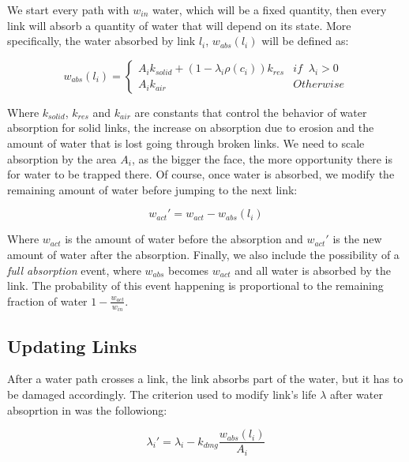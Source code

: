 \vspace{10pt}

We start every path with $w_{in}$ water, which will be a fixed quantity, then 
every link will absorb a quantity of water that will depend on its state. 
More specifically, the water absorbed by link $l_i$, $w_{abs}(l_i)$
will be defined as:

\begin{equation}\label{eq:w_abs}
    w_{abs}(l_i) = \begin{cases}
        A_ik_{solid} + (1 - \lambda_i \rho(c_i))k_{res} & if \; \; \lambda_i > 0\\
        A_ik_{air} & Otherwise
    \end{cases}
\end{equation}

Where $k_{solid}$, $k_{res}$ and $k_{air}$ are constants that control the 
behavior of water absorption for solid links, the increase on absorption 
due to erosion and the amount of water that is lost going through broken 
links. We need to scale absorption by the area $A_i$, as the bigger 
the face, the more opportunity there is for water to be trapped there. 
Of course, once water is absorbed, we modify the remaining amount of water 
before jumping to the next link:

\begin{equation}
    w_{act}' = w_{act} - w_{abs}(l_i)
\end{equation}

Where $w_{act}$ is the amount of water before the absorption and 
$w_{act}'$ is the new amount of water after the absorption. Finally,
we also include the possibility of a \textit{full absorption} event, 
where $w_{abs}$ becomes $w_{act}$ and all water is absorbed by the link. 
The probability of this event happening is proportional to the remaining 
fraction of water $1 - \frac{w_{act}}{w_{in}}$.
\subsection{Updating Links} \label{sec:linkUpdate}
After a water path crosses a link, the link absorbs part of the water,
but it has to be damaged accordingly. The criterion used to modify link's
life $\lambda$ after water absoprtion in \cite{10.2312:ceig.20241139} was 
the followiong:

\begin{equation}
    \lambda_i' = \lambda_i - k_{dmg}\frac{w_{abs}(l_i)}{A_i}
\end{equation}


